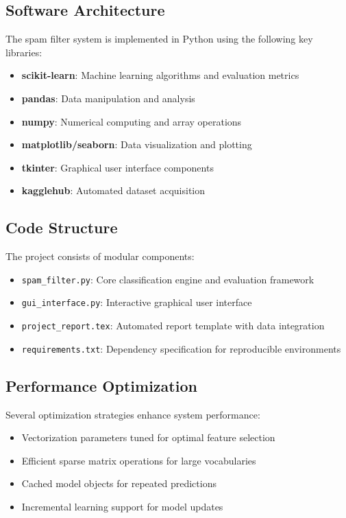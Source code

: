 \documentclass[12pt,a4paper]{article}
\begin{document}
\subsection{Software Architecture}

The spam filter system is implemented in Python using the following key libraries:

\begin{itemize}
    \item \textbf{scikit-learn}: Machine learning algorithms and evaluation metrics
    \item \textbf{pandas}: Data manipulation and analysis
    \item \textbf{numpy}: Numerical computing and array operations
    \item \textbf{matplotlib/seaborn}: Data visualization and plotting
    \item \textbf{tkinter}: Graphical user interface components
    \item \textbf{kagglehub}: Automated dataset acquisition
\end{itemize}

\subsection{Code Structure}

The project consists of modular components:

\begin{itemize}
    \item \texttt{spam\_filter.py}: Core classification engine and evaluation framework
    \item \texttt{gui\_interface.py}: Interactive graphical user interface
    \item \texttt{project\_report.tex}: Automated report template with data integration
    \item \texttt{requirements.txt}: Dependency specification for reproducible environments
\end{itemize}

\subsection{Performance Optimization}

Several optimization strategies enhance system performance:

\begin{itemize}
    \item Vectorization parameters tuned for optimal feature selection
    \item Efficient sparse matrix operations for large vocabularies
    \item Cached model objects for repeated predictions
    \item Incremental learning support for model updates
\end{itemize}
\end{document}
